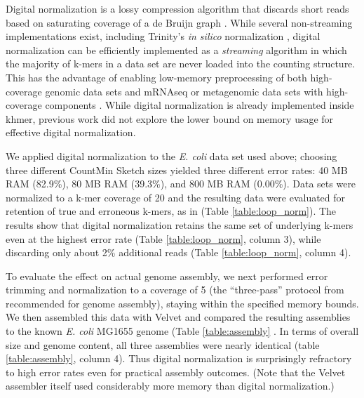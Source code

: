 \documentclass{article}
\begin{document}
Digital normalization is a lossy compression algorithm that discards
short reads based on saturating coverage of a de Bruijn graph
\cite{Brown2012}.  While several non-streaming implementations exist, including
Trinity's {\em in silico} normalization \cite{Haas2013,Brown2012blog}, digital normalization can be efficiently implemented as a {\em
  streaming} algorithm in which the majority of k-mers in a data set
are never loaded into the counting structure.  This has the advantage of enabling low-memory
preprocessing of both high-coverage genomic data sets and mRNAseq or
metagenomic data sets with high-coverage components \cite{Brown2012,
  Howe2012}.  While digital normalization is already
implemented inside khmer, previous work did not explore the lower bound
on memory usage for effective digital normalization.

We applied digital normalization to the {\em E. coli} data set used
above; choosing three different CountMin Sketch sizes yielded three different
error rates: 40 MB RAM (82.9\%), 80 MB RAM (39.3\%), and 800 MB RAM
(0.00\%).  Data sets were normalized to a k-mer coverage of 20 and the
resulting data were evaluated for retention of true and erroneous
k-mers, as in \cite{Brown2012} (Table \ref{table:loop_norm}).  The results show that
digital normalization retains the same set of underlying
k-mers even at the highest error rate (Table \ref{table:loop_norm}, column 3), while discarding only
about 2\% additional reads (Table \ref{table:loop_norm}, column 4).

To evaluate the effect on actual genome assembly, we next performed
error trimming and normalization to a coverage of 5 (the
``three-pass'' protocol from \cite{Brown2012} recommended for
genome assembly), staying within the specified memory bounds.  We then
assembled this data with Velvet \cite{Zerbino2008} and compared the resulting assemblies to the known
{\em E. coli} MG1655 genome (Table \ref{table:assembly} .  In terms of overall size
and genome content, all three assemblies were nearly identical (table
\ref{table:assembly}, column 4).  Thus digital normalization is surprisingly refractory to high
error rates even for practical assembly outcomes.  (Note that
the Velvet assembler itself used considerably more memory than digital
normalization.)
\end{document}
